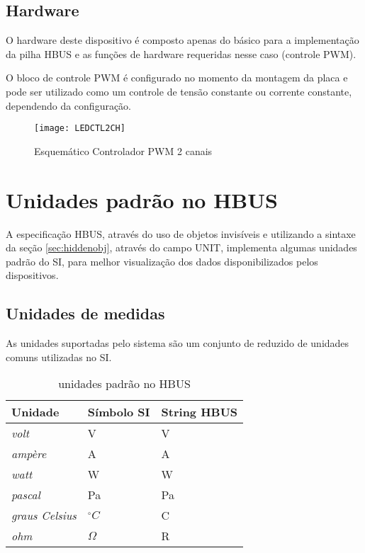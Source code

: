 \documentclass[11pt]{report}
\begin{document}
\section{Hardware}

O hardware deste dispositivo é composto apenas do básico para a implementação da pilha HBUS e as funções de hardware requeridas nesse caso (controle PWM).

O bloco de controle PWM é configurado no momento da montagem da placa e pode ser utilizado como um controle de tensão constante ou corrente constante, dependendo da configuração.


\begin{figure}[H]
\centering
\texttt{[image: LEDCTL2CH]}
\caption{Esquemático Controlador PWM 2 canais}
\end{figure}

\appendix
\chapter{Unidades padrão no HBUS}

A especificação HBUS, através do uso de objetos invisíveis e utilizando a sintaxe da seção \ref{sec:hiddenobj}, através do campo UNIT, implementa algumas unidades padrão do SI, para melhor visualização dos dados disponibilizados pelos dispositivos.

\section{Unidades de medidas}

As unidades suportadas pelo sistema são um conjunto de reduzido de unidades comuns utilizadas no SI.

\begin{table}[H]
\centering
\caption{unidades padrão no HBUS}
\begin{tabular}{l l l}
\hline
Unidade		&	Símbolo SI	&	String HBUS\\
\hline
\textit{volt} & V			&	V\\
\textit{ampère} & A			&   A\\
\textit{watt}   & W			&   W\\
\textit{pascal} & Pa			&   Pa\\
\textit{graus Celsius} & $^{\circ} C$ & C\\
\textit{ohm}		& $\Omega$	&	R\\
\end{tabular}
\end{table}
\end{document}

